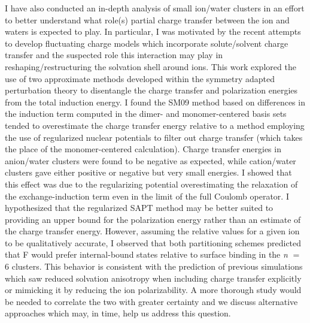 \begin{sie}
  I have also conducted an in-depth analysis of small ion/water clusters in an effort to better understand what role(s) partial charge transfer between
  the ion and waters is expected to play. In particular, I was motivated by the recent attempts to develop fluctuating charge models which incorporate
  solute/solvent charge transfer and the suspected role this interaction may play in reshaping/restructuring the solvation shell around ions. This work
  explored the use of two approximate methods developed within the symmetry adapted perturbation theory to disentangle the charge transfer and 
  polarization energies from the total induction energy. I found the SM09 method based on differences in the induction term computed in the dimer- 
  and monomer-centered basis sets tended to overestimate the charge transfer energy relative to a method employing the use of regularized nuclear
  potentials to filter out charge transfer (which takes the place of the monomer-centered calculation). Charge transfer energies in anion/water clusters
  were found to be negative as expected, while cation/water clusters gave either positive or negative but very small energies. I showed that this effect
  was due to the regularizing potential overestimating the relaxation of the exchange-induction term even in the limit of the full Coulomb operator. I
  hypothesized that the regularized SAPT method may be better suited to providing an upper bound for the polarization energy rather than an estimate of the 
  charge transfer energy. However, assuming the relative values for a given ion to be qualitatively accurate, I observed that both partitioning schemes
  predicted that F\sur{-} would prefer internal-bound states relative to surface binding in the \emph{n} $=$ 6 clusters. This behavior is consistent with
  the prediction of previous simulations which saw reduced solvation anisotropy when including charge transfer explicitly or mimicking it by reducing the
  ion polarizability. A more thorough study would be needed to correlate the two with greater certainty and we discuss alternative approaches which may,
  in time, help us address this question.

\end{sie}